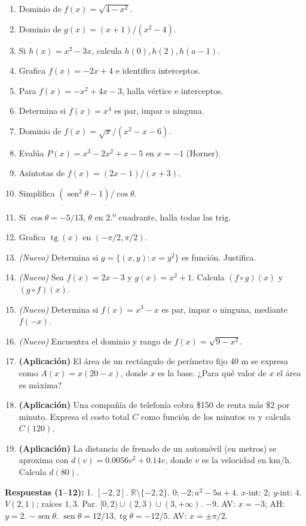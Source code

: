 \documentclass[12pt,letterpaper]{book}
\newcommand{\sen}{\operatorname{sen}}
\newcommand{\tg}{\operatorname{tg}}
\begin{document}
\begin{enumerate}
\item Dominio de $f(x)=\sqrt{4-x^2}$.
\item Dominio de $g(x)=(x+1)/(x^2-4)$.
\item Si $h(x)=x^2-3x$, calcula $h(0),h(2),h(a-1)$.
\item Grafica $f(x)=-2x+4$ e identifica interceptos.
\item Para $f(x)=-x^2+4x-3$, halla vértice e interceptos.
\item Determina si $f(x)=x^4$ es par, impar o ninguna.
\item Dominio de $f(x)=\sqrt x/(x^2-x-6)$.
\item Evalúa $P(x)=x^3-2x^2+x-5$ en $x=-1$ (Horner).
\item Asíntotas de $f(x)=(2x-1)/(x+3)$.
\item Simplifica $(\sen^2\theta-1)/\cos\theta$.
\item Si $\cos\theta=-5/13$, $\theta$ en 2.\textsuperscript{o} cuadrante, halla todas las trig.
\item Grafica $\tg(x)$ en $(-\pi/2,\pi/2)$.
\item \textit{(Nuevo)} Determina si $g=\{(x,y):x=y^2\}$ es función. Justifica.
\item \textit{(Nuevo)} Sea $f(x)=2x-3$ y $g(x)=x^2+1$. Calcula $(f\circ g)(x)$ y $(g\circ f)(x)$.
\item \textit{(Nuevo)} Determina si $f(x)=x^3-x$ es par, impar o ninguna, mediante $f(-x)$.
\item \textit{(Nuevo)} Encuentra el dominio y rango de $f(x)=\sqrt{9-x^2}$.
\item \textbf{(Aplicación)} El área de un rectángulo de perímetro fijo $40$ m se expresa como $A(x)=x(20-x)$, donde $x$ es la base. ¿Para qué valor de $x$ el área es máxima?
\item \textbf{(Aplicación)} Una compañía de telefonía cobra \$150 de renta más \$2 por minuto. Expresa el costo total $C$ como función de los minutos $m$ y calcula $C(120)$.
\item \textbf{(Aplicación)} La distancia de frenado de un automóvil (en metros) se aproxima con $d(v)=0.0056v^2+0.14v$, donde $v$ es la velocidad en km/h. Calcula $d(80)$.
\end{enumerate}

\textbf{Respuestas (1--12):} 1. $[-2,2]$. $\mathbb{R}\setminus\{-2,2\}$. $0;-2;a^2-5a+4$. $x$-int: $2$; $y$-int: $4$. $V(2,1)$; raíces $1,3$. Par. $[0,2)\cup(2,3)\cup(3,+\infty)$. $-9$. AV: $x=-3$; AH: $y=2$. $-\sen\theta$. $\sen\theta=12/13,\tg\theta=-12/5$. AV: $x=\pm\pi/2$.
\end{document}
